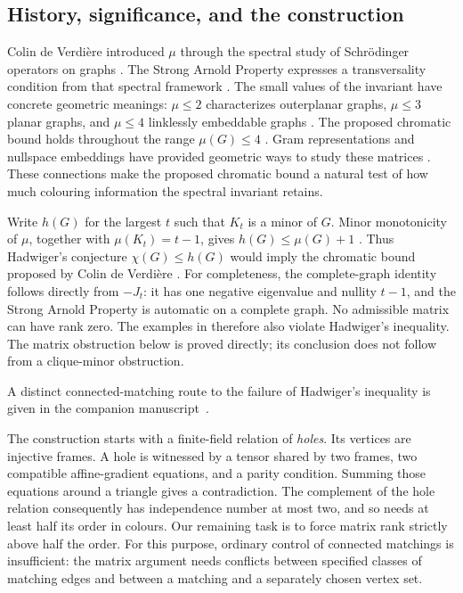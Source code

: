 \subsection{History, significance, and the construction}

Colin de Verdière introduced \(\mu\) through the spectral study of
Schrödinger operators on graphs \citep{cdv1990,hls1999}.
The Strong Arnold Property expresses a transversality condition from
that spectral framework \citep{cdv1988arnold}. The small values of the
invariant have concrete geometric meanings: \(\mu\le2\) characterizes
outerplanar graphs, \(\mu\le3\) planar graphs, and \(\mu\le4\)
linklessly embeddable graphs \citep{cdv1990,lovaszschrijver1998,hls1999}.
The proposed chromatic bound holds throughout the range
\(\mu(G)\le4\) \citep[p.~35]{hls1999}.
Gram representations and nullspace embeddings have provided geometric
ways to study these matrices \citep{kotlovlovaszvempala1997,lovaszschrijver1999}.
These connections make the proposed chromatic bound a natural test of
how much colouring information the spectral invariant retains.

Write \(h(G)\) for the largest \(t\) such that \(K_t\) is a minor of
\(G\). Minor monotonicity of \(\mu\), together with
\(\mu(K_t)=t-1\), gives \(h(G)\le\mu(G)+1\)
\citep[\S1.3 and Theorem~2.4]{hls1999}. Thus Hadwiger's conjecture
\(\chi(G)\le h(G)\) \citep{hadwiger1943} would imply the chromatic
bound proposed by Colin de Verdière \citep{cdv1990,cdv1998,hls1999}.
For completeness, the complete-graph identity follows directly from
\(-J_t\): it has one negative eigenvalue and nullity \(t-1\), and the
Strong Arnold Property is automatic on a complete graph. No admissible
matrix can have rank zero. The examples in  therefore
also violate Hadwiger's inequality. The matrix obstruction below is
proved directly; its conclusion does not follow from a clique-minor
obstruction.

A distinct connected-matching route to the failure of Hadwiger's inequality
is given in the companion manuscript~\citep[Theorem~1.1 and Corollary~1.2]{OpenAIHadwigerCounterexample2026}.

The construction starts with a finite-field relation of \emph{holes}.
Its vertices are injective frames. A hole is witnessed by a tensor
shared by two frames, two compatible affine-gradient equations, and a
parity condition. Summing those equations around a triangle gives a
contradiction. The complement of the hole relation consequently has
independence number at most two, and so needs at least half its order
in colours. Our remaining task is to force matrix rank strictly above
half the order. For this purpose, ordinary control of connected
matchings is insufficient: the matrix argument needs conflicts between
specified classes of matching edges and between a matching and a
separately chosen vertex set.

